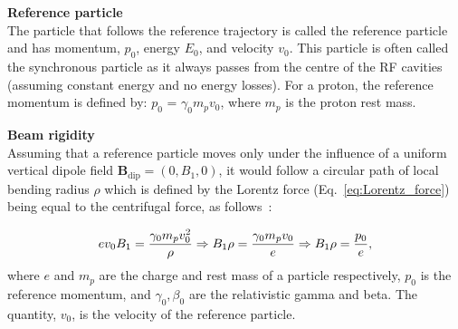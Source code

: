 




\textbf{Reference particle}\\
The particle that follows the reference trajectory is called the reference particle and has momentum, $p_0$, energy $E_0$, and velocity $v_0$.  This particle is often called the synchronous particle as it always passes from the centre of the RF cavities (assuming constant energy and no energy losses). For a proton, the reference momentum is defined by: $p_0$ = $\gamma_0 m_p v_0$, where $m_p$ is the proton rest mass.


\textbf{Beam rigidity}\\
Assuming that a reference particle moves only under the influence of a uniform vertical dipole field $\mathbf{B_\mathrm{dip}}=(0, B_1, 0)$, it would follow a circular path of local bending radius $\rho$ which is defined by the Lorentz force (Eq.~\eqref{eq:Lorentz_force}) being equal to the centrifugal force, as follows~\cite{wolski2014}: %

\begin{equation}\label{eq:Brho}
    e v_0 B_1 = \frac{{\gamma_0} m_p v_0^2}{\rho} \Rightarrow B_1 \rho = \frac{\gamma_0 m_p v_0}{e} \Rightarrow B_1 \rho = \frac{p_0}{e},
\end{equation}
where $e$ and $m_p$ are the charge and rest mass of a particle respectively, $p_0$ is the reference momentum, and $\gamma_0, \beta_0$ are the relativistic gamma and beta. The quantity, $v_0$, is the velocity of the reference particle.


